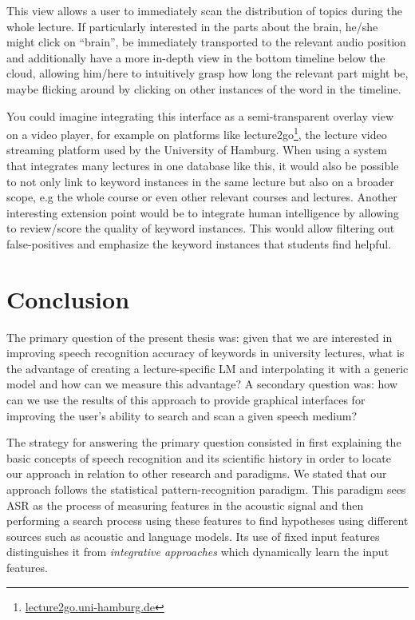 \documentclass[]{article}
\begin{document}
This view allows a user to immediately scan the distribution of topics
during the whole lecture. If particularly interested in the parts about
the brain, he/she might click on ``brain'', be immediately transported
to the relevant audio position and additionally have a more in-depth
view in the bottom timeline below the cloud, allowing him/here to
intuitively grasp how long the relevant part might be, maybe flicking
around by clicking on other instances of the word in the timeline.

You could imagine integrating this interface as a semi-transparent
overlay view on a video player, for example on platforms like
lecture2go\footnote{\url{lecture2go.uni-hamburg.de}}, the lecture video
streaming platform used by the University of Hamburg. When using a
system that integrates many lectures in one database like this, it would
also be possible to not only link to keyword instances in the same
lecture but also on a broader scope, e.g the whole course or even other
relevant courses and lectures. Another interesting extension point would
be to integrate human intelligence by allowing to review/score the
quality of keyword instances. This would allow filtering out
false-positives and emphasize the keyword instances that students find
helpful.

\section{Conclusion}\label{conclusion-2}

The primary question of the present thesis was: given that we are
interested in improving speech recognition accuracy of keywords in
university lectures, what is the advantage of creating a
lecture-specific LM and interpolating it with a generic model and how
can we measure this advantage? A secondary question was: how can we use
the results of this approach to provide graphical interfaces for
improving the user's ability to search and scan a given speech medium?

The strategy for answering the primary question consisted in first
explaining the basic concepts of speech recognition and its scientific
history in order to locate our approach in relation to other research
and paradigms. We stated that our approach follows the statistical
pattern-recognition paradigm. This paradigm sees ASR as the process of
measuring features in the acoustic signal and then performing a search
process using these features to find hypotheses using different sources
such as acoustic and language models. Its use of fixed input features
distinguishes it from \emph{integrative approaches} which dynamically
learn the input features.
\end{document}

